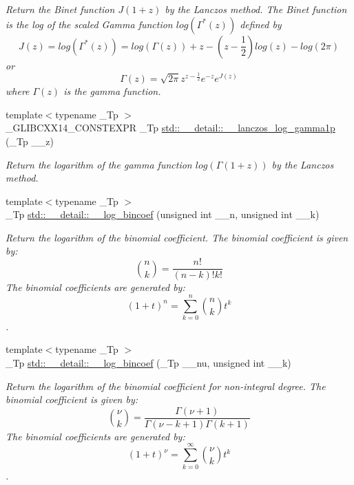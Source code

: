 \begin{DoxyCompactItemize}
\begin{DoxyCompactList}\small\item\em Return the Binet function $ J(1+z) $ by the Lanczos method. The Binet function is the log of the scaled Gamma function $ log(\Gamma^*(z)) $ defined by \[ J(z) = log(\Gamma^*(z)) = log\left(\Gamma(z)\right) + z - \left(z-\frac{1}{2}\right) log(z) - log(2\pi) \] or \[ \Gamma(z) = \sqrt{2\pi}z^{z-\frac{1}{2}}e^{-z}e^{J(z)} \] where $ \Gamma(z) $ is the gamma function. \end{DoxyCompactList}\item 
{\footnotesize template$<$typename \+\_\+\+Tp $>$ }\\\+\_\+\+G\+L\+I\+B\+C\+X\+X14\+\_\+\+C\+O\+N\+S\+T\+E\+X\+PR \+\_\+\+Tp \hyperlink{namespacestd_1_1____detail_a4586aeea80ba556ab8d6393dadb05c5c}{std\+::\+\_\+\+\_\+detail\+::\+\_\+\+\_\+lanczos\+\_\+log\+\_\+gamma1p} (\+\_\+\+Tp \+\_\+\+\_\+z)
\begin{DoxyCompactList}\small\item\em Return the logarithm of the gamma function $ log(\Gamma(1+z)) $ by the Lanczos method. \end{DoxyCompactList}\item 
{\footnotesize template$<$typename \+\_\+\+Tp $>$ }\\\+\_\+\+Tp \hyperlink{namespacestd_1_1____detail_a152324942f37ae3c6fc65aec1f17049e}{std\+::\+\_\+\+\_\+detail\+::\+\_\+\+\_\+log\+\_\+bincoef} (unsigned int \+\_\+\+\_\+n, unsigned int \+\_\+\+\_\+k)
\begin{DoxyCompactList}\small\item\em Return the logarithm of the binomial coefficient. The binomial coefficient is given by\+: \[ \binom{n}{k} = \frac{n!}{(n-k)! k!} \] The binomial coefficients are generated by\+: \[ \left(1 + t\right)^n = \sum_{k=0}^n \binom{n}{k} t^k \]. \end{DoxyCompactList}\item 
{\footnotesize template$<$typename \+\_\+\+Tp $>$ }\\\+\_\+\+Tp \hyperlink{namespacestd_1_1____detail_abd174c4887c0f3bbb5125e2a65856386}{std\+::\+\_\+\+\_\+detail\+::\+\_\+\+\_\+log\+\_\+bincoef} (\+\_\+\+Tp \+\_\+\+\_\+nu, unsigned int \+\_\+\+\_\+k)
\begin{DoxyCompactList}\small\item\em Return the logarithm of the binomial coefficient for non-\/integral degree. The binomial coefficient is given by\+: \[ \binom{\nu}{k} = \frac{\Gamma(\nu+1)}{\Gamma(\nu-k+1) \Gamma(k+1)} \] The binomial coefficients are generated by\+: \[ \left(1 + t\right)^\nu = \sum_{k=0}^\infty \binom{\nu}{k} t^k \]. \end{DoxyCompactList}\item 

\end{DoxyCompactItemize}
